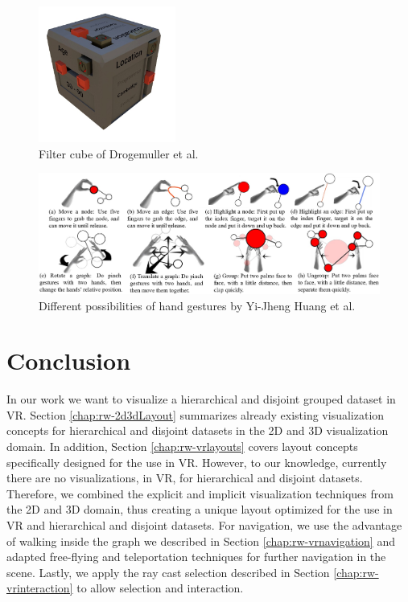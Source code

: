 \begin{figure}[h]
    \centering
    \includegraphics[width=0.4\textwidth]{graphics/filterCube.jpg}
    \caption{Filter cube of Drogemuller et al. \cite{drogemuller_vrige_2017}} 
    \label{fig:vrFilterCube} 
\end{figure}

\begin{figure}[h]
    \centering
    \includegraphics[width=1\textwidth]{graphics/handGestures.jpg}
    \caption{Different possibilities of hand gestures by Yi-Jheng Huang et al. \cite{yi-jheng_huang_gesture_2017}} 
    \label{fig:vrHandGestures} 
\end{figure}

\section{Conclusion}

In our work we want to visualize a hierarchical and disjoint grouped dataset in VR.
Section \ref{chap:rw-2d3dLayout} summarizes already existing visualization concepts for hierarchical and disjoint datasets in the 2D and 3D visualization domain. 
In addition, Section \ref{chap:rw-vrlayouts} covers layout concepts specifically designed for the use in VR. However, to our knowledge, currently there are no visualizations, in VR, for hierarchical and disjoint datasets.
Therefore, we combined the explicit and implicit visualization techniques from the 2D and 3D domain, thus creating a unique layout optimized for the use in VR and hierarchical and disjoint datasets.
For navigation, we use the advantage of walking inside the graph we described in Section \ref{chap:rw-vrnavigation} and adapted free-flying and teleportation techniques for further navigation in the scene. Lastly, we apply the ray cast selection described in Section \ref{chap:rw-vrinteraction} to allow selection and interaction.  